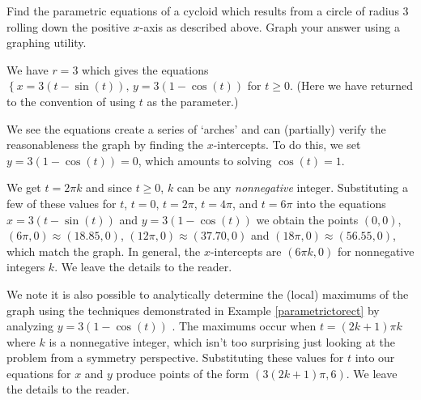 \documentclass{ximera}
\begin{document}
\begin{example} \label{cycloidex}  Find the parametric equations of a cycloid which results from a circle of radius $3$ rolling down the positive $x$-axis as described above.  Graph your answer using a graphing utility.

\begin{explanation}
    
We have $r = 3$ which gives the equations $\left\{ x = 3(t -\sin(t)), \, y = 3(1-\cos(t)) \right.$ for $t \geq 0$.  (Here we have returned to the convention of using $t$ as the parameter.) 

\begin{center}
\end{center}



We see the equations create a series of `arches' and can (partially) verify the reasonableness the graph by finding the $x$-intercepts.  To do this, we set $y = 3(1-\cos(t)) = 0$, which amounts to solving $\cos(t) = 1$.  

We get $t = 2 \pi k$ and since $t \geq 0$, $k$ can be any \textit{nonnegative} integer.  Substituting a few of these values for $t$, $t = 0$, $t = 2\pi$, $t = 4\pi$, and $t=6\pi$ into the equations $x = 3(t -\sin(t))$ and $y = 3(1-\cos(t))$ we obtain the points $(0,0)$, $(6\pi, 0) \approx (18.85, 0)$,  $(12 \pi,0) \approx (37.70, 0)$ and $(18\pi, 0) \approx ( 56.55 , 0)$, which match the graph. In general, the $x$-intercepts are $(6\pi k, 0)$ for nonnegative integers $k$.  We leave the details to the reader.

We note it is also possible to analytically determine  the (local) maximums of the graph using the techniques demonstrated in Example \ref{parametrictorect}  by analyzing $y = 3(1-\cos(t))$ .   The maximums occur when $t = (2k +1) \pi k$ where $k$ is a nonnegative integer, which isn't too surprising just looking at the problem from a  symmetry perspective.  Substituting these values for $t$ into our equations for $x$ and $y$ produce points of the form $(3(2k+1) \pi, 6)$.  We leave the details to the reader.  

\end{explanation} 

\end{example}





\closegraphsfile
\end{document}
